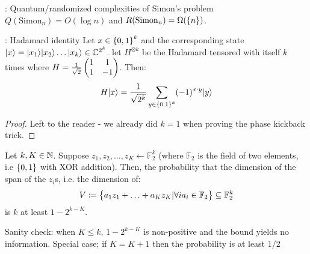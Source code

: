\begin{propbox}{: Quantum/randomized complexities of Simon's problem}
    $Q(\text{Simon}_n) = O(\log n)$ and $R(\text{Simon}_n) = \Omega(\set{n})$.
\end{propbox}

\begin{lembox}{: Hadamard identity}
    Let $x \in \set{0, 1}^k$ and the corresponding state $\lvert x \rangle = \lvert x_1 \rangle\lvert x_2 \rangle \ldots \lvert x_k \rangle \in \mathbb{C}^{2^k}$. let $H^{\otimes k}$ be the Hadamard tensored with itself $k$ times where $H = \frac{1}{\sqrt{2}}\begin{pmatrix}1 & 1 \\ 1 & -1\end{pmatrix}$. Then:
    \begin{equation}
        H\lvert x \rangle = \frac{1}{\sqrt{2^k}}\sum_{y \in \set{0, 1}^k}(-1)^{x \cdot y} \lvert y \rangle
    \end{equation}
\end{lembox}
\begin{proof}
    Left to the reader - we already did $k = 1$ when proving the phase kickback trick.
\end{proof}

\begin{lembox}{}
    Let $k, K \in \mathbb{N}$. Suppose $z_1, z_2, \ldots, z_K \leftarrow \mathbb{F}^k_2$ (where $\mathbb{F}_2$ is the field of two elements, i.e $\set{0, 1}$ with XOR addition). Then, the probability that the dimension of the span of the $z_i$s, i.e. the dimension of:
    \begin{equation}
        V \coloneqq \set{a_1 z_1 + \ldots + a_Kz_K \vert \forall i a_i \in \mathbb{F}_2} \subseteq \mathbb{F}_2^k
    \end{equation} 
    is $k$ at least $1 - 2^{k-K}$. 
\end{lembox}

Sanity check: when $K \leq k$, $1 - 2^{k-K}$ is non-positive and the bound yields no information. Special case; if $K = K + 1$ then the probability is at least $1/2$